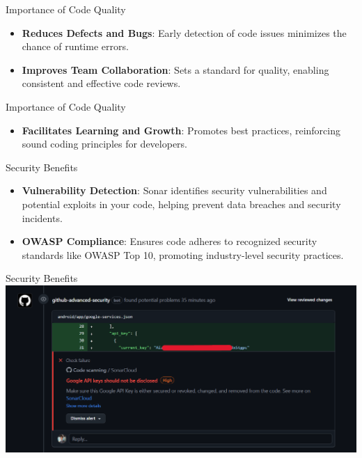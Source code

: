 \documentclass{beamer}
\begin{document}
\begin{frame}{Importance of Code Quality}
  \begin{itemize}
    \item \textbf{Reduces Defects and Bugs}: Early detection of code issues minimizes the chance of runtime errors.
    \vspace*{1em}
    \item \textbf{Improves Team Collaboration}: Sets a standard for quality, enabling consistent and effective code reviews.
  \end{itemize}
\end{frame}

\begin{frame}{Importance of Code Quality}
  \begin{itemize}
    \item \textbf{Facilitates Learning and Growth}: Promotes best practices, reinforcing sound coding principles for developers.
  \end{itemize}
\end{frame}


\begin{frame}{Security Benefits}
  \begin{itemize}
    \item \textbf{Vulnerability Detection}: Sonar identifies security vulnerabilities and potential exploits in your code, helping prevent data breaches and security incidents.
    \vspace*{1em}
    \item \textbf{OWASP Compliance}: Ensures code adheres to recognized security standards like OWASP Top 10, promoting industry-level security practices.
  \end{itemize}
\end{frame}

\begin{frame}{Security Benefits}
  \includegraphics[width=1\textwidth]{fig/api-security-1.PNG}
\end{frame}
\end{document}
